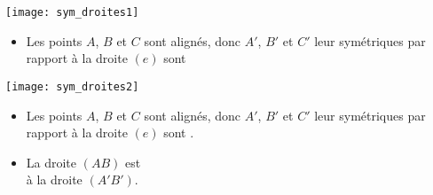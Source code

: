 \documentclass[12pt,a4paper]{article}
\date{}
\title{}
\begin{document}



%	
%	
%
%



\begin{myexs}
	\begin{multicols}{2}
		\begin{center}
			\texttt{[image: sym\_droites1]}
		\end{center}
		
		\begin{itemize}
			\item Les points $A$, $B$ et $C$ sont alignés, donc $A'$, $B'$ et $C'$ leur symétriques par rapport à la droite $(e)$ sont \hspace*{6cm}
		\end{itemize}	
		
		\begin{center}
			\texttt{[image: sym\_droites2]}
		\end{center}
		
		\begin{itemize}
			\item Les points $A$, $B$ et $C$ sont alignés, donc $A'$, $B'$ et $C'$ leur symétriques par rapport à la droite $(e)$ sont \hspace*{6cm}.
			\item La droite $(AB)$ est \hspace*{4cm} \\ à la droite $(A'B')$.
		\end{itemize}
	\end{multicols}
\end{myexs}
\end{document}
